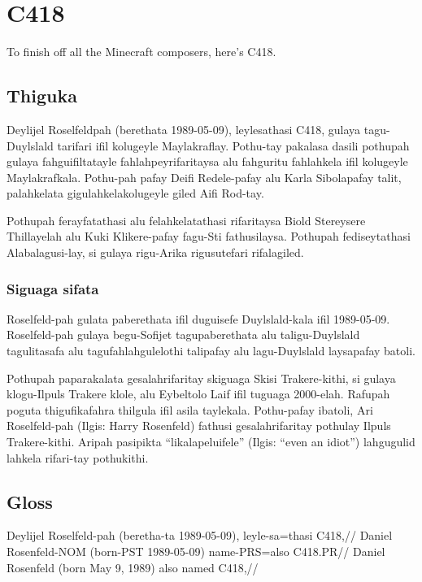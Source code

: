 

\chapter{C418}
To finish off all the Minecraft composers, here's C418.

\section{Thiguka}
Deylijel Roselfeldpah (berethata 1989-05-09), leylesathasi C418, gulaya tagu-Duylslald tarifari ifil kolugeyle Maylakraflay.
Pothu-tay pakalasa dasili pothupah gulaya fahguifiltatayle fahlahpeyrifaritaysa alu fahguritu fahlahkela ifil kolugeyle Maylakrafkala.
Pothu-pah pafay Deifi Redele-pafay alu Karla Sibolapafay talit, palahkelata gigulahkelakolugeyle giled Aifi Rod-tay.

Pothupah ferayfatathasi alu felahkelatathasi rifaritaysa Biold Stereysere Thillayelah alu Kuki Klikere-pafay fagu-Sti fathusilaysa.
Pothupah fediseytathasi Alabalagusi-lay, si gulaya rigu-Arika rigusutefari rifalagiled.

\subsection{Siguaga sifata}
Roselfeld-pah gulata paberethata ifil duguisefe Duylslald-kala ifil 1989-05-09.
Roselfeld-pah gulaya begu-Sofijet tagupaberethata alu taligu-Duylslald tagulitasafa alu tagufahlahgulelothi talipafay alu lagu-Duylslald laysapafay batoli.

Pothupah paparakalata gesalahrifaritay skiguaga Skisi Trakere-kithi, si gulaya klogu-Ilpuls Trakere klole, alu Eybeltolo Laif ifil tuguaga 2000-elah.
Rafupah poguta thigufikafahra thilgula ifil asila taylekala.
Pothu-pafay ibatoli, Ari Roselfeld-pah (Ilgis: Harry Rosenfeld) fathusi gesalahrifaritay pothulay Ilpuls Trakere-kithi.
Aripah pasipikta ``likalapeluifele'' (Ilgis: ``even an idiot'') lahgugulid lahkela rifari-tay pothukithi.

\newpage

\section{Gloss}

\ex
\begingl
          \gla  Deylijel Roselfeld-pah (beretha-ta 1989-05-09), leyle-sa=thasi C418,//
          \glb  Daniel Rosenfeld-NOM (born-PST 1989-05-09) name-PRS=also C418.PR//
          \glft Daniel Rosenfeld (born May 9, 1989) also named C418,//
\endgl
\xe

